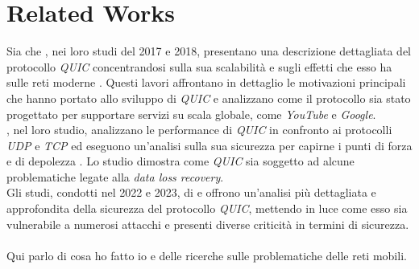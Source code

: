 \chapter{Related Works}
\label{cap:RelatedWorks}

Sia  che  , nei loro studi del 2017 e 2018, presentano una descrizione dettagliata
del protocollo \emph{QUIC} concentrandosi sulla sua scalabilità e sugli effetti che esso ha sulle reti moderne \cite{article:handshake,article:wild}.
Questi lavori affrontano in dettaglio le motivazioni principali che hanno portato allo sviluppo di \emph{QUIC} e analizzano come il protocollo sia stato progettato per 
supportare servizi su scala globale, come \emph{YouTube} e \emph{Google}. \\
, nel loro studio, analizzano le performance di \emph{QUIC} in confronto ai protocolli \emph{UDP} e \emph{TCP} ed eseguono un'analisi sulla sua sicurezza 
per capirne i punti di forza e di depolezza \cite{article:securityAnaP}. Lo studio dimostra come \emph{QUIC} sia soggetto ad alcune problematiche legate alla \emph{data loss recovery}.
\\
Gli studi, condotti nel 2022 e 2023, di \citeauthor{article:QuicAtt} e  offrono un'analisi più dettagliata e approfondita
della sicurezza del protocollo \emph{QUIC}, mettendo in luce come esso sia vulnerabile a numerosi attacchi e presenti diverse criticità in termini di sicurezza\cite{article:QuicAtt,article:forge}.
\\\\
Qui parlo di cosa ho fatto io e delle ricerche sulle problematiche delle reti mobili. 